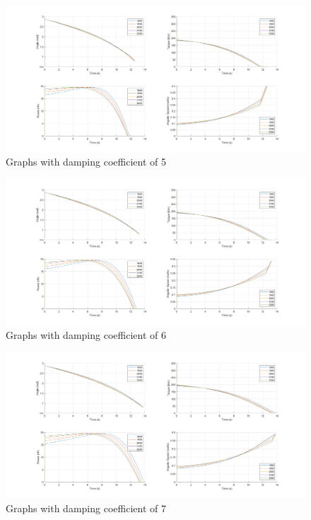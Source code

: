 \documentclass[a4paper]{article}
\begin{document}
\begin{figure}[H]
\centering
\includegraphics[width=1\textwidth]{Damping_5.png}
    \caption{\label{Damping5} Graphs with damping coefficient of 5}
\end{figure}

\begin{figure}[H]
\centering
\includegraphics[width=1\textwidth]{Damping_6.png}
    \caption{\label{Damping6} Graphs with damping coefficient of 6}
\end{figure}

\begin{figure}[H]
\centering
\includegraphics[width=1\textwidth]{Damping_7.png}
    \caption{\label{Damping7} Graphs with damping coefficient of 7}
\end{figure}
\end{document}
